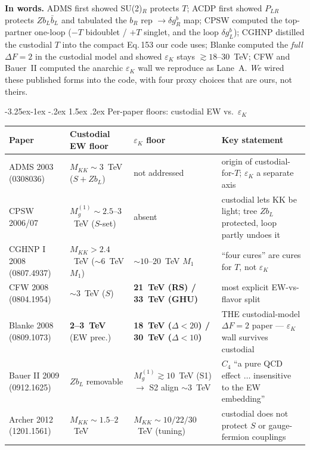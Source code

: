 \documentclass[11pt]{article}
\makeatletter
\renewcommand\subsection{\@startsection{subsection}{2}{\z@}%
  {-3.25ex\@plus -1ex \@minus -.2ex}%
  {1.5ex \@plus .2ex}%
  {\normalfont\large\bfseries\color{accent}}}
\makeatother
\begin{document}
\textbf{In words.} ADMS first showed SU(2)$_R$ protects $T$; ACDP first showed
$P_{LR}$ protects $Z b_L\bar b_L$ and tabulated the $b_R$ rep $\to\delta g_R^b$
map; CPSW computed the top-partner one-loop ($-T$ bidoublet / $+T$ singlet, and
the loop $\delta g_L^b$); CGHNP distilled the custodial $T$ into the compact
Eq.\,153 our code uses; Blanke computed the \emph{full} $\Delta F=2$ in the
custodial model and showed $\varepsilon_K$ stays $\gtrsim18$--$30$~TeV; CFW and
Bauer~II computed the anarchic $\varepsilon_K$ wall we reproduce as Lane~A.
\emph{We} wired these published forms into the code, with four proxy choices that
are ours, not theirs.

\subsection{Per-paper floors: custodial EW vs.\ $\varepsilon_K$}

\begin{center}
\footnotesize
\renewcommand{\arraystretch}{1.3}
\setlength{\tabcolsep}{5pt}
\begin{tabular}{@{}>{\raggedright\arraybackslash}p{}>{\raggedright\arraybackslash}p{}>{\raggedright\arraybackslash}p{}>{\raggedright\arraybackslash}p{}@{}}
\toprule
\textbf{Paper} & \textbf{Custodial EW floor} & \textbf{$\varepsilon_K$ floor} & \textbf{Key statement} \\
\midrule
ADMS 2003 (0308036) & $M_{KK}\sim3$~TeV ($S{+}Zb_L$) & not addressed & origin of custodial-for-$T$; $\varepsilon_K$ a separate axis \\
CPSW 2006/07 & $M_g^{(1)}\sim2.5$--$3$~TeV ($S$-set) & absent & custodial lets KK be light; tree $Zb_L$ protected, loop partly undoes it \\
CGHNP I 2008 (0807.4937) & $M_{KK}{>}2.4$~TeV (${\sim}6$~TeV $M_1$) & ${\sim}10$--$20$~TeV $M_1$ & ``four cures'' are cures for $T$, not $\varepsilon_K$ \\
CFW 2008 (0804.1954) & ${\sim}3$~TeV ($S$) & \textbf{21~TeV (RS) / 33~TeV (GHU)} & most explicit EW-vs-flavor split \\
Blanke 2008 (0809.1073) & \textbf{2--3~TeV} (EW prec.) & \textbf{18~TeV ($\Delta{<}20$) / 30~TeV ($\Delta{<}10$)} & THE custodial-model $\Delta F{=}2$ paper --- $\varepsilon_K$ wall survives custodial \\
Bauer II 2009 (0912.1625) & $Zb_L$ removable & $M_g^{(1)}\gtrsim10$~TeV (S1) $\to$ S2 align ${\sim}3$~TeV & $C_4$ ``a pure QCD effect $\ldots$ insensitive to the EW embedding'' \\
Archer 2012 (1201.1561) & $M_{KK}\sim1.5$--$2$~TeV & $M_{KK}\sim10/22/30$~TeV (tuning) & custodial does not protect $S$ or gauge-fermion couplings \\
\bottomrule
\end{tabular}
\end{center}
\end{document}

